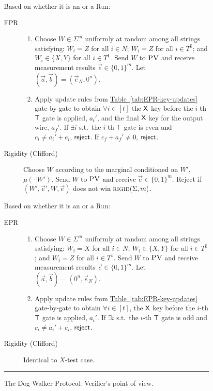 \documentclass[11pt]{article}
\numberwithin{equation}{section}
\theoremstyle{definition}
\theoremstyle{plain}
\newcommand{\expref}[2]{\hyperref[#2]{#1~\ref{#2}}}
\newcommand{\rigid}{\textsc{rigid}}
\newcommand{\pv}{\textsc{PV}}
\begin{document}
\begin{figure}[H]
\begin{description}
\begin{description}
\begin{enumerate}
		\end{enumerate}
	\end{description}
\item[$X$-test] Based on whether it is
an  or a  Run:
\vspace{-0.07cm}   %
\begin{description}
	\item[EPR] 
	\begin{enumerate}
		\item[(i)] Choose $W\in\Sigma^m$ uniformly at random among all strings satisfying: $W_i=Z$ for all $i\in N$; $W_i=Z$ for all $i\in T^0$; and $W_i\in\{X,Y\}$ for all $i\in T^1$. Send $W$ to $\pv$ and receive measurement results $\vec{e}\in\{0,1\}^m$. Let $(\vec{a},\vec{b})=(\vec{e}_N,0^n)$. 
		\item[(ii)] Apply update rules from \expref{Table}{tab:EPR-key-updates} gate-by-gate to obtain $\forall i\in [t]$ the $\sf X$ key before the $i$-th $\sf T$ gate is applied, $a_i'$, and the final $\sf X$ key for the output wire, $a_f'$. 
If $\exists i$ s.t.\ the $i$-th $\sf T$ gate is even and $c_i\neq a_i'+e_i$, $\sf reject$. If $c_f+a_f'\neq 0$, $\sf reject$. 
	\end{enumerate}
\vspace{-0.15cm}  %
	\item[Rigidity (Clifford)] Choose ${W}$ according to the marginal conditioned on ${W}'$, $\mu(\cdot|{W}')$. 
	  Send ${W}$ to $\pv$ and receive $\vec{e}\in\{0,1\}^m$. Reject if   $({W}',\vec{e}',{W},\vec{e})$ does not win $\rigid(\Sigma,m)$. 
\end{description}

\item[$Z$-test] Based on whether it is
an  or a  Run:
\vspace{-0.07cm}   %
\begin{description}
	\item[EPR] 
	\begin{enumerate}
		\item[(i)] Choose $W\in\Sigma^m$ uniformly at random among all strings satisfying: $W_i=X$ for all $i\in N$; $W_i\in\{X,Y\}$ for all $i\in T^0$; and $W_i=Z$ for all $i\in T^1$. Send $W$ to $\pv$ and receive measurement results $\vec{e}\in\{0,1\}^m$. Let $(\vec{a},\vec{b})=(0^n,\vec{e}_N)$.
		\item[(ii)] Apply update rules from \expref{Table}{tab:EPR-key-updates} gate-by-gate to obtain $\forall i\in [t]$, the $\sf X$ key before the $i$-th $\sf T$ gate is applied, $a_i'$. 
If $\exists i$ s.t.\ the $i$-th $\sf T$ gate is odd and $c_i\neq a_i'+e_i$, $\sf reject$. 
	\end{enumerate}
	\item[Rigidity (Clifford)] Identical to $X$-test case.
\end{description}
\end{description}
\rule[2ex]{\textwidth}{0.5pt}\vspace{-.5cm}
\caption{The Dog-Walker Protocol: Verifier's point of view.}\label{fig:dogwalker-protocol-V}
\end{figure}
\end{document}
